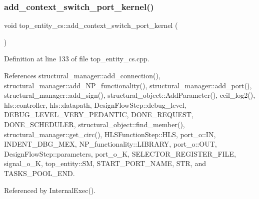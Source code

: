 \subsubsection{\texorpdfstring{add\+\_\+context\+\_\+switch\+\_\+port\+\_\+kernel()}{add\_context\_switch\_port\_kernel()}}
{\footnotesize\ttfamily void top\+\_\+entity\+\_\+cs\+::add\+\_\+context\+\_\+switch\+\_\+port\+\_\+kernel (\begin{DoxyParamCaption}{ }\end{DoxyParamCaption})\hspace{0.3cm}{\ttfamily [protected]}}



Definition at line 133 of file top\+\_\+entity\+\_\+cs.\+cpp.



References structural\+\_\+manager\+::add\+\_\+connection(), structural\+\_\+manager\+::add\+\_\+\+N\+P\+\_\+functionality(), structural\+\_\+manager\+::add\+\_\+port(), structural\+\_\+manager\+::add\+\_\+sign(), structural\+\_\+object\+::\+Add\+Parameter(), ceil\+\_\+log2(), hls\+::controller, hls\+::datapath, Design\+Flow\+Step\+::debug\+\_\+level, D\+E\+B\+U\+G\+\_\+\+L\+E\+V\+E\+L\+\_\+\+V\+E\+R\+Y\+\_\+\+P\+E\+D\+A\+N\+T\+IC, D\+O\+N\+E\+\_\+\+R\+E\+Q\+U\+E\+ST, D\+O\+N\+E\+\_\+\+S\+C\+H\+E\+D\+U\+L\+ER, structural\+\_\+object\+::find\+\_\+member(), structural\+\_\+manager\+::get\+\_\+circ(), H\+L\+S\+Function\+Step\+::\+H\+LS, port\+\_\+o\+::\+IN, I\+N\+D\+E\+N\+T\+\_\+\+D\+B\+G\+\_\+\+M\+EX, N\+P\+\_\+functionality\+::\+L\+I\+B\+R\+A\+RY, port\+\_\+o\+::\+O\+UT, Design\+Flow\+Step\+::parameters, port\+\_\+o\+\_\+K, S\+E\+L\+E\+C\+T\+O\+R\+\_\+\+R\+E\+G\+I\+S\+T\+E\+R\+\_\+\+F\+I\+LE, signal\+\_\+o\+\_\+K, top\+\_\+entity\+::\+SM, S\+T\+A\+R\+T\+\_\+\+P\+O\+R\+T\+\_\+\+N\+A\+ME, S\+TR, and T\+A\+S\+K\+S\+\_\+\+P\+O\+O\+L\+\_\+\+E\+ND.



Referenced by Internal\+Exec().

